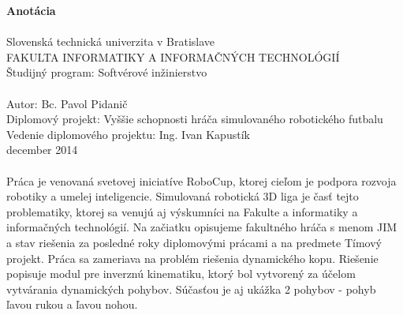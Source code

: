 \begin{titlepage}
\large\textbf{Anotácia}\\\\
\normalsize
Slovenská technická univerzita v Bratislave \\
FAKULTA INFORMATIKY A INFORMAČNÝCH TECHNOLÓGIÍ \\
Študijný program: Softvérové inžinierstvo \\
\\
Autor: Bc. Pavol Pidanič \\
Diplomový projekt: Vyššie schopnosti hráča simulovaného robotického futbalu \\
Vedenie diplomového projektu: Ing. Ivan Kapustík \\ 
december 2014 \\
\\
Práca je venovaná svetovej iniciatíve RoboCup, ktorej cieľom je podpora rozvoja robotiky a umelej inteligencie. Simulovaná robotická 3D liga je časť tejto problematiky, ktorej sa venujú aj výskumníci na Fakulte a informatiky a informačných technológií. Na začiatku opisujeme fakultného hráča s menom JIM a stav riešenia za posledné roky diplomovými prácami a na predmete Tímový projekt. Práca sa zameriava na problém riešenia dynamického kopu. Riešenie popisuje modul pre inverznú kinematiku, ktorý bol vytvorený za účelom vytvárania dynamických pohybov. Súčasťou je aj ukážka 2 pohybov - pohyb ľavou rukou a ľavou nohou.


\end{titlepage}